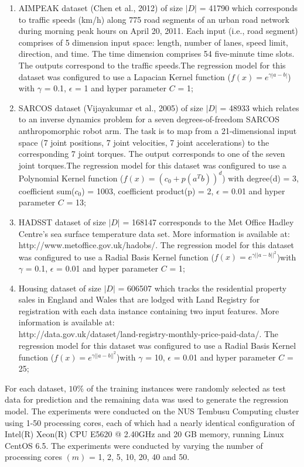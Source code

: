 \documentclass[12pt]{article}
\begin{document}
\begin{enumerate}[label=(\alph*)]
\item AIMPEAK dataset  (Chen et al., 2012) of size $|D|$ = 41790 which corresponds to traffic speeds (km/h) along 775 road segments of an urban road network during morning peak hours on April 20, 2011. Each input (i.e., road segment) comprises of 5 dimension input space: length, number of lanes, speed limit, direction, and time. The time dimension comprises 54 five-minute time slots. The outputs correspond to the traffic speeds.The regression model for this dataset was configured to use a Lapacian Kernel function ($f(x) = e^{\gamma |a - b|}$) with $\gamma$ = 0.1, $\epsilon$ = 1 and hyper parameter $C$ = 1;
\item SARCOS dataset (Vijayakumar et al., 2005) of size $|D|$ = 48933 which relates to an inverse dynamics problem for a seven degrees-of-freedom SARCOS anthropomorphic robot arm. The task is to map from a 21-dimensional input space (7 joint positions, 7 joint velocities, 7 joint accelerations) to the corresponding 7 joint torques. The output corresponds to one of the seven joint torques.The regression model for this dataset was configured to use a Polynomial Kernel function ($f(x) = (c_{0} + p(a^Tb))^d $) with degree(d) = 3, coefficient sum($c_{0}$) = 1003, coefficient product(p) = 2, $\epsilon$ = 0.01 and hyper parameter $C$ = 13;
\item HADSST dataset of size $|D|$ = 168147 corresponds to the Met Office Hadley Centre's sea surface temperature data set. More information is available at:\\ http://www.metoffice.gov.uk/hadobs/. The regression model for this dataset was configured to use a Radial Basis Kernel function ($f(x) = e^{\gamma ||a - b||^2}$)with $\gamma$ = 0.1, $\epsilon$ = 0.01 and hyper parameter $C$ = 1;
\item Housing dataset of size $|D|$ = 606507 which tracks the residential property sales in England and Wales that are lodged with Land Registry for registration with each data instance containing two input features. More information is available at:\\ http://data.gov.uk/dataset/land-registry-monthly-price-paid-data/. The regression model for this dataset was configured to use a Radial Basis Kernel function ($f(x) = e^{\gamma ||a - b||^2}$)with $\gamma$ = 10, $\epsilon$ = 0.01 and hyper parameter $C$ = 25;
\end{enumerate}
For each dataset, $10\%$ of the training instances were randomly selected as test data for prediction and the remaining data was used to generate the regression model.
\newline\newline
The experiments were conducted on the NUS Tembusu Computing cluster using 1-50 processing cores, each of which had a nearly identical configuration of Intel(R) Xeon(R) CPU E5620 @ 2.40GHz and 20 GB memory, running Linux CentOS 6.5. The experiments were conducted by varying the number of processing cores $(m)$ = 1, 2, 5, 10, 20, 40 and 50.
\end{document}
